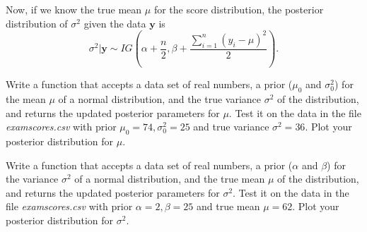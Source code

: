 Now, if we know the true mean $\mu$ for the score distribution, the posterior distribution of $\sigma^{2}$ given the data $\mathbf{y}$ is $$\sigma^{2} | \mathbf{y} \sim IG \left(\alpha + \frac{n}{2}, \beta + \frac{\sum_{i=1}^{n} (y_{i} - \mu)^{2}}{2}\right).$$

\begin{problem}
Write a function that accepts a data set of real numbers, a prior ($\mu_{0}$ and $\sigma_{0}^{2}$) for the mean $\mu$ of a normal distribution, and the true variance $\sigma^{2}$ of the distribution, and returns the updated posterior parameters for $\mu$. Test it on the data in the file \emph{examscores.csv} with prior $\mu_{0} = 74, \sigma_{0}^{2} = 25$ and true variance $\sigma^{2} = 36$. Plot your posterior distribution for $\mu$.
\end{problem}

\begin{problem}
Write a function that accepts a data set of real numbers, a prior ($\alpha$ and $\beta$) for the variance $\sigma^{2}$ of a normal distribution, and the true mean $\mu$ of the distribution, and returns the updated posterior parameters for $\sigma^{2}$. Test it on the data in the file \emph{examscores.csv} with prior $\alpha=2, \beta = 25$ and true mean $\mu = 62$. Plot your posterior distribution for $\sigma^{2}$.
\end{problem}